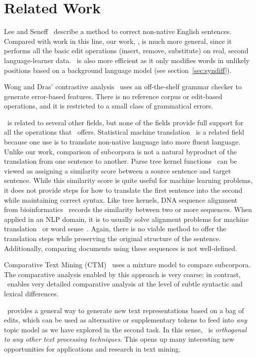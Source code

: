 \section{Related Work}
\label{sec:related}

Lee and Seneff~\cite{lee-seneff-2006} describe a method to correct non-native
English sentences.
Compared with work in this line, our work, \sd,
is much more general, since it performs all the basic edit operations
(insert, remove, substitute) on real, second language-learner data.
\sd~is also more efficient as it only
modifies words in unlikely positions based on a background language model (see
section~\ref{sec:syndiff}).

Wong and Dras' contrastive analysis~\cite{wong-contrastive} uses an
off-the-shelf grammar checker to generate error-based features. There is no
reference corpus or edit-based operations, and it is restricted to a small class
of grammatical errors.

\sd~is related to several other fields, but none of the fields provide full
support for all the operations that \sd~offers. Statistical machine
translation~\cite{smt-survey} is a related field because one use is to translate
non-native language into more fluent language.
Unlike
our work, comparison of subcorpora is not a natural byproduct of the translation
from one sentence to another. Parse tree kernel functions~\cite{tree-kernels}
can be viewed as assigning a similarity score between a source sentence and
target sentence. While this similarity score is quite
useful for machine learning problems, it does not provide steps for how to
translate the first sentence into the second while maintaining correct syntax.
Like tree kernels, DNA sequence alignment from
bioinformatics~\cite{seq-align-survey} records the similarity between two or
more sequences. When applied in an NLP domain, it is to usually solve alignment
problems for machine translation~\cite{paraphrase} or word
sense~\cite{lexical-choice}. Again, there is no viable method to offer the
translation steps while preserving the original structure of the sentence.
Additionally, comparing documents using these sequences is not well-defined.

Comparative Text Mining (CTM)~\cite{ctm}
uses a mixture model to compare subcorpora.
The comparative analysis enabled by this
approach is very coarse; in contrast, \sd~enables very detailed comparative
analysis at the level of subtle syntactic and lexical differences.

\sd~provides a general way to generate new text representations based on a bag
of edits, which can be used as alternative or supplementary tokens to feed into
{\em any} topic model as we have explored in the second task. In this sense,
\sd~is {\em orthogonal to any other text processing techniques}. This opens up
many interesting new opportunities for applications and research in text mining.

